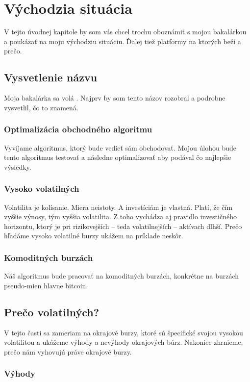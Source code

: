 \chapter{Východzia situácia}\label{chap:intro} 

V tejto úvodnej kapitole by som vás chcel trochu oboznámiť s mojou bakalárkou a poukázať na moju východziu situáciu. Ďalej tiež platformy na ktorých beží a prečo. 
\section{Vysvetlenie názvu} 
Moja bakalárka sa volá . Najprv by som tento názov rozobral a podrobne vysvetlil, čo to znamená. 
\subsection{Optimalizácia obchodného algoritmu} 
Vyvíjame algoritmus, ktorý bude vedieť sám obchodovať. Mojou úlohou bude tento algoritmus testovať a následne optimalizovať aby podával čo najlepšie výsledky. 
\subsection{Vysoko volatilných} 
Volatilita\cite{Volatilita} je kolísanie. Miera neistoty. A investíciám je vlastná. Platí, že čím vyššie výnosy, tým vyššia volatilita. Z toho vychádza aj pravidlo investičného horizontu, ktorý je pri rizikovejších – teda volatilnejších – aktívach dlhší. Prečo hľadáme  vysoko volatilné burzy ukážem na príklade neskôr. 
\subsection{Komoditných burzách} 
Náš algoritmus bude pracovať na komoditných burzách, konkrétne na burzách pseudo-mien  hlavne bitcoin. 

\section{Prečo volatilných?} 
V tejto časti sa zameriam na okrajové burzy, ktoré sú špecifické svojou vysokou volatilitou 
a ukážeme výhody a nevýhody okrajových búrz. Nakoniec zhrnieme, prečo nám vyhovujú práve okrajové burzy. 
\subsection{Výhody} 

